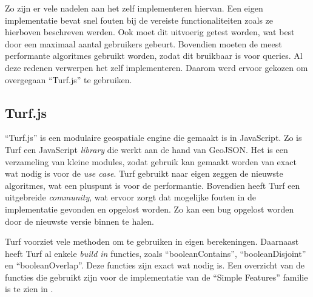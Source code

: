 Zo zijn er vele nadelen aan het zelf implementeren hiervan. Een eigen implementatie bevat snel fouten bij de vereiste functionaliteiten zoals ze hierboven beschreven werden. Ook moet dit uitvoerig getest worden, wat best door een maximaal aantal gebruikers gebeurt. Bovendien moeten de meest performante algoritmes gebruikt worden, zodat dit bruikbaar is voor queries. Al deze redenen verwerpen het zelf implementeren. Daarom werd ervoor gekozen om overgegaan ``Turf.js'' te gebruiken.

\subsection{Turf.js}
``Turf.js'' is een modulaire geospatiale engine die gemaakt is in JavaScript. Zo is Turf een JavaScript \textit{library} die werkt aan de hand van GeoJSON. Het is een verzameling van kleine modules, zodat gebruik kan gemaakt worden van exact wat nodig is voor de \textit{use case}. Turf gebruikt naar eigen zeggen de nieuwste algoritmes, wat een pluspunt is voor de performantie. Bovendien heeft Turf een uitgebreide \textit{community}, wat ervoor zorgt dat mogelijke fouten in de implementatie gevonden en opgelost worden. Zo kan een bug opgelost worden door de nieuwste versie binnen te halen.

Turf voorziet vele methoden om te gebruiken in eigen berekeningen. Daarnaast heeft Turf al enkele \textit{build in} functies, zoals ``booleanContains'', ``booleanDisjoint'' en ``booleanOverlap''. Deze functies zijn exact wat nodig is. Een overzicht van de functies die gebruikt zijn voor de implementatie van de ``Simple Features'' familie is te zien in .

